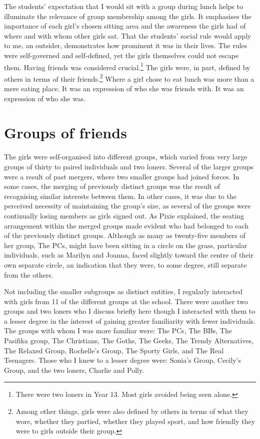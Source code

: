 The students' expectation that I would sit with a group during lunch helps to illuminate the relevance of group membership among the girls. It emphasises the importance of each girl's chosen sitting area and the awareness the girls had of where and with whom other girls sat. That the students' social rule would apply to me, an outsider, demonstrates how prominent it was in their lives. The rules were self-governed and self-defined, yet the girls themselves could not escape them. Having friends was considered crucial.\footnote{There were two loners in Year 13. Most girls avoided being seen alone.}  The girls were, in part, defined by others in terms of their friends.\footnote{Among other things, girls were also defined by others in terms of what they wore, whether they partied, whether they played sport, and how friendly they were to girls outside their group.}  Where a girl chose to eat lunch was more than a mere eating place. It was an expression of who she was friends with. It was an expression of who she was.



\section{Groups of friends}\label{lunchlocale}

The girls were self-organised into different groups, which varied from very large groups of thirty to paired individuals and two loners. Several of the larger groups were a result of past mergers, where two smaller groups had joined forces. In some cases, the merging of previously distinct groups was the result of recognising similar interests between them. In other cases, it was due to the perceived necessity of maintaining the group's size, as several of the groups were continually losing members as girls signed out. As Pixie explained, the seating arrangement within the merged groups made evident who had belonged to each of the previously distinct groups. Although as many as twenty-five members of her group, The PCs, might have been sitting in a circle on the grass, particular individuals, such as Marilyn and Joanna, faced slightly toward the centre of their own separate circle, an indication that they were, to some degree, still separate from the others. 


Not including the smaller subgroups as distinct entities, I regularly interacted with girls from 11 of the different groups at the school. There were another two groups and two loners who I discuss briefly here though I interacted with them to a lesser degree in the interest of gaining greater familiarity with fewer individuals. The groups with whom I was more familiar were: The PCs, The BBs, The Pasifika group, The Christians, The Goths, The Geeks, The Trendy Alternatives, The Relaxed Group, Rochelle's Group, The Sporty Girls, and The Real Teenagers. Those who I knew to a lesser degree were: Sonia's Group, Cecily's Group, and the two loners, Charlie and Polly. 

